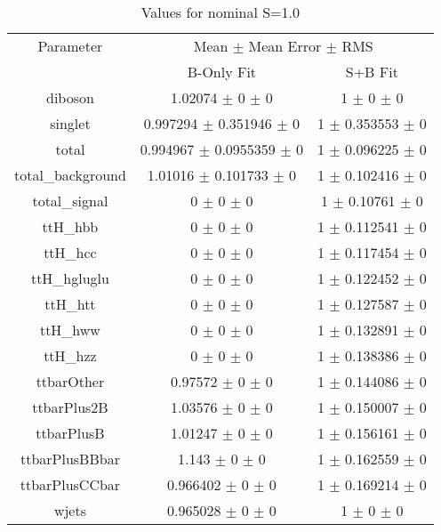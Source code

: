 \begin{table}
\centering
\caption{Values for nominal S=1.0}
\begin{tabular}{ccc}
\toprule
Parameter & \multicolumn{2}{c}{Mean $\pm$ Mean Error $\pm$ RMS}\\
 & B-Only Fit & S+B Fit\\
\midrule
diboson & \num{1.02074} $\pm$ \num{0} $\pm$ \num{0} & \num{1} $\pm$ \num{0} $\pm$ \num{0}\\
singlet & \num{0.997294} $\pm$ \num{0.351946} $\pm$ \num{0} & \num{1} $\pm$ \num{0.353553} $\pm$ \num{0}\\
total & \num{0.994967} $\pm$ \num{0.0955359} $\pm$ \num{0} & \num{1} $\pm$ \num{0.096225} $\pm$ \num{0}\\
total\_background & \num{1.01016} $\pm$ \num{0.101733} $\pm$ \num{0} & \num{1} $\pm$ \num{0.102416} $\pm$ \num{0}\\
total\_signal & \num{0} $\pm$ \num{0} $\pm$ \num{0} & \num{1} $\pm$ \num{0.10761} $\pm$ \num{0}\\
ttH\_hbb & \num{0} $\pm$ \num{0} $\pm$ \num{0} & \num{1} $\pm$ \num{0.112541} $\pm$ \num{0}\\
ttH\_hcc & \num{0} $\pm$ \num{0} $\pm$ \num{0} & \num{1} $\pm$ \num{0.117454} $\pm$ \num{0}\\
ttH\_hgluglu & \num{0} $\pm$ \num{0} $\pm$ \num{0} & \num{1} $\pm$ \num{0.122452} $\pm$ \num{0}\\
ttH\_htt & \num{0} $\pm$ \num{0} $\pm$ \num{0} & \num{1} $\pm$ \num{0.127587} $\pm$ \num{0}\\
ttH\_hww & \num{0} $\pm$ \num{0} $\pm$ \num{0} & \num{1} $\pm$ \num{0.132891} $\pm$ \num{0}\\
ttH\_hzz & \num{0} $\pm$ \num{0} $\pm$ \num{0} & \num{1} $\pm$ \num{0.138386} $\pm$ \num{0}\\
ttbarOther & \num{0.97572} $\pm$ \num{0} $\pm$ \num{0} & \num{1} $\pm$ \num{0.144086} $\pm$ \num{0}\\
ttbarPlus2B & \num{1.03576} $\pm$ \num{0} $\pm$ \num{0} & \num{1} $\pm$ \num{0.150007} $\pm$ \num{0}\\
ttbarPlusB & \num{1.01247} $\pm$ \num{0} $\pm$ \num{0} & \num{1} $\pm$ \num{0.156161} $\pm$ \num{0}\\
ttbarPlusBBbar & \num{1.143} $\pm$ \num{0} $\pm$ \num{0} & \num{1} $\pm$ \num{0.162559} $\pm$ \num{0}\\
ttbarPlusCCbar & \num{0.966402} $\pm$ \num{0} $\pm$ \num{0} & \num{1} $\pm$ \num{0.169214} $\pm$ \num{0}\\
wjets & \num{0.965028} $\pm$ \num{0} $\pm$ \num{0} & \num{1} $\pm$ \num{0} $\pm$ \num{0}\\
\bottomrule
\end{tabular}
\end{table}